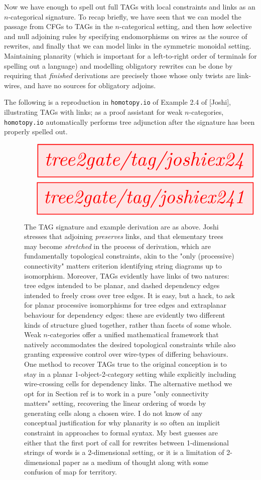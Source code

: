 Now we have enough to spell out full TAGs with local constraints and links as an $n$-categorical signature. To recap briefly, we have seen that we can model the passage from CFGs to TAGs in the $n$-categorical setting, and then how selective and null adjoining rules by specifying endomorphisms on wires as the source of rewrites, and finally that we can model links in the symmetric monoidal setting. Maintaining planarity (which is important for a left-to-right order of terminals for spelling out a language) and modelling obligatory rewrites can be done by requiring that \emph{finished} derivations are precisely those whose only twists are link-wires, and have no sources for obligatory adjoins.

\begin{example}
The following is a reproduction in \texttt{homotopy.io} of Example 2.4 of [Joshi], illustrating TAGs with links; as a proof assistant for weak $n$-categories, \texttt{homotopy.io} automatically performs tree adjunction after the signature has been properly spelled out.

\begin{figure}[h!]
\centering
\[\resizebox{\textwidth}{!}{\tikzfig{tree2gate/tag/joshiex24}}\]
\[\resizebox{\textwidth}{!}{\tikzfig{tree2gate/tag/joshiex241}}\]
\caption{The TAG signature and example derivation are as above. Joshi stresses that adjoining \emph{preserves} links, and that elementary trees may become \emph{stretched} in the process of derivation, which are fundamentally topological constraints, akin to the "only (processive) connectivity" matters criterion identifying string diagrams up to isomorphism. Moreover, TAGs evidently have links of two natures: tree edges intended to be planar, and dashed dependency edges intended to freely cross over tree edges. It is easy, but a hack, to ask for planar processive isomorphisms for tree edges and extraplanar behaviour for dependency edges: these are evidently two different kinds of structure glued together, rather than facets of some whole. Weak $n$-categories offer a unified mathematical framework that natively accommodates the desired topological constraints while also granting expressive control over wire-types of differing behaviours. One method to recover TAGs true to the original conception is to stay in a planar 1-object-2-category setting while explicitly including wire-crossing cells for dependency links. The alternative method we opt for in Section \bR ref \e is to work in a pure "only connectivity matters" setting, recovering the linear ordering of words by generating cells along a chosen wire. I do not know of any conceptual justification for why planarity is so often an implicit constraint in approaches to formal syntax. My best guesses are either that the first port of call for rewrites between 1-dimensional strings of words is a 2-dimensional setting, or it is a limitation of 2-dimensional paper as a medium of thought along with some confusion of map for territory.}
\end{figure}


\end{example}
